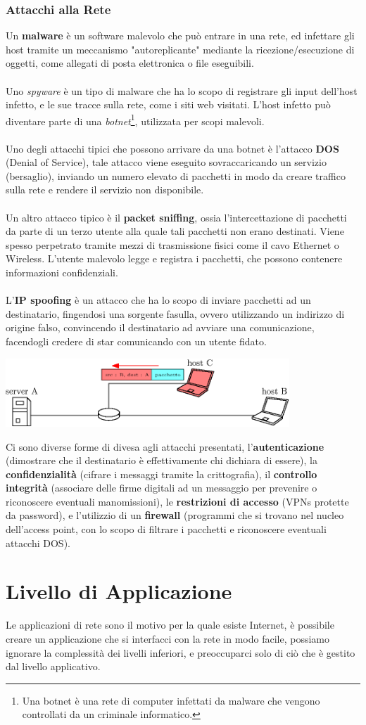 \documentclass[12pt, letterpaper]{article}
\newcommand{\acc}{\\\hphantom{}\\}
\begin{document}
\subsubsection{Attacchi alla Rete} 
 Un \textbf{malware} è un software malevolo che può entrare in una rete, ed infettare gli host tramite un  
 meccanismo "autoreplicante" mediante la ricezione/esecuzione di oggetti, come allegati di posta elettronica 
 o file eseguibili.\acc Uno \textit{spyware} è un tipo di malware che ha lo scopo di registrare gli input 
 dell'host infetto, e le sue tracce sulla rete, come i siti web visitati. L'host infetto può diventare parte 
 di una \textit{botnet}\footnote{Una botnet è una rete di computer infettati da malware che vengono controllati da un criminale informatico.},
 utilizzata per scopi malevoli.\acc 
 Uno degli attacchi tipici che possono arrivare da una botnet è l'attacco \textbf{DOS} (Denial of Service), 
 tale attacco viene eseguito sovraccaricando un servizio (bersaglio), inviando un numero elevato di pacchetti in modo 
 da creare traffico sulla rete e rendere il servizio non disponibile.\acc 
 Un altro attacco tipico è il \textbf{packet sniffing}, ossia l'intercettazione di pacchetti da parte di un terzo 
 utente alla quale tali pacchetti non erano destinati. Viene spesso perpetrato tramite mezzi di 
 trasmissione fisici come il cavo Ethernet o Wireless. L'utente malevolo legge e registra i pacchetti, che possono 
 contenere informazioni confidenziali.\acc 
 L'\textbf{IP spoofing} è un attacco che ha lo scopo di inviare pacchetti ad un destinatario, fingendosi una 
 sorgente fasulla, ovvero utilizzando un indirizzo di origine falso, convincendo il destinatario ad avviare una comunicazione, facendogli 
 credere di star comunicando con un utente fidato.\begin{center}
    \includegraphics[width=0.8\textwidth ]{images/spoofing.eps}
 \end{center}
 Ci sono diverse forme di divesa agli attacchi presentati, l'\textbf{autenticazione} (dimostrare che il destinatario 
 è effettivamente chi dichiara di essere), la \textbf{confidenzialità} (cifrare i messaggi tramite la crittografia), 
 il \textbf{controllo integrità} (associare delle firme digitali ad un messaggio per prevenire o riconoscere eventuali 
 manomissioni), le \textbf{restrizioni di accesso} (VPNs protette da password), e l'utilizzio di un 
 \textbf{firewall} (programmi che si trovano nel nucleo dell'access point, con lo scopo di filtrare i pacchetti 
 e riconoscere eventuali attacchi DOS).
 \section{Livello di Applicazione}
 Le applicazioni di rete sono il motivo per la quale esiste 
 Internet, è possibile creare un applicazione che si interfacci con 
 la rete in modo facile, possiamo ignorare la complessità dei 
 livelli inferiori, e preoccuparci solo di ciò che è gestito dal 
 livello applicativo.
 
\end{document}
